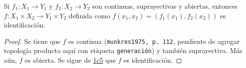 

\begin{proposition}
Si $f_1 : X_1 \longrightarrow Y_1$ y $f_2 : X_2 \longrightarrow Y_2$ son continuas, suprayectivas y abiertas, entonces $f : X_1 \times X_2 \longrightarrow Y_1 \times Y_2$ definida como $f(x_1, x_2) = (f_1(x_1), f_2(x_2))$ es identificación.
\end{proposition}

\begin{proof}
Se tiene que $f$ es continua (\texttt{munkres1975, p. 112}, pendiente de agregar topología producto aquí con etiqueta \texttt{generación}) y también suprayectiva. Más aún, $f$ es abierta. Se sigue de \hyperref[card:1c5]{\textsf{1c5}} que $f$ es identificación.
\end{proof}
